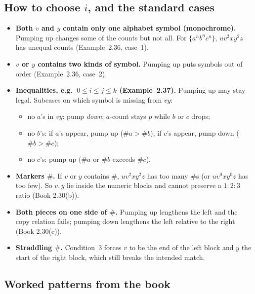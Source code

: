 \documentclass[11pt,a4paper]{article}
\begin{document}
\subsection{How to choose $i$, and the standard cases}

\begin{itemize}
  \item \textbf{Both $v$ and $y$ contain only one alphabet symbol
        (monochrome).} Pumping up changes some of the counts but
        not all. For $\{a^nb^nc^n\}$, $uv^2xy^2z$ has unequal
        counts (Example~2.36, case~1).
  \item \textbf{$v$ or $y$ contains two kinds of symbol.} Pumping
        up puts symbols out of order (Example~2.36, case~2).
  \item \textbf{Inequalities, e.g.\ $0\le i\le j\le k$
        (Example~2.37).} Pumping up may stay legal. Subcases on
        which symbol is missing from $vy$:
        \begin{itemize}[nosep]
          \item no $a$'s in $vy$: pump \emph{down}; $a$-count
                stays $p$ while $b$ or $c$ drops;
          \item no $b$'s: if $a$'s appear, pump up
                ($\#a>\#b$); if $c$'s appear, pump down
                ($\#b>\#c$);
          \item no $c$'s: pump up ($\#a$ or $\#b$ exceeds
                $\#c$).
        \end{itemize}
  \item \textbf{Markers $\#$.} If $v$ or $y$ contains $\#$,
        $uv^2xy^2z$ has too many $\#$s (or $uv^0xy^0z$ has too
        few). So $v,y$ lie inside the numeric blocks and cannot
        preserve a $1:2:3$ ratio (Book 2.30(b)).
  \item \textbf{Both pieces on one side of $\#$.} Pumping up
        lengthens the left and the copy relation fails; pumping
        down lengthens the left relative to the right
        (Book 2.30(c)).
  \item \textbf{Straddling $\#$.} Condition~3 forces $v$ to be
        the end of the left block and $y$ the start of the right
        block, which still breaks the intended match.
\end{itemize}

\subsection{Worked patterns from the book}
\end{document}
